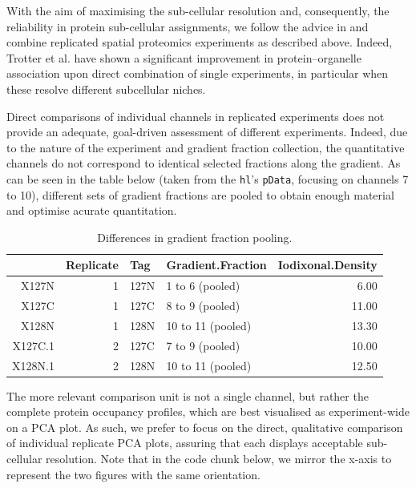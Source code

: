 With the aim of maximising the sub-cellular resolution and,
consequently, the reliability in protein sub-cellular assignments, we
follow the advice in \cite{Trotter:2010} and combine replicated spatial
proteomics experiments as described above. Indeed, Trotter et
al. have shown a significant improvement in protein–organelle
association upon direct combination of single experiments, in
particular when these resolve different subcellular niches.

Direct comparisons of individual channels in replicated experiments
does not provide an adequate, goal-driven assessment of different
experiments. Indeed, due to the nature of the experiment and gradient
fraction collection, the quantitative channels do not correspond to
identical selected fractions along the gradient. As can be seen in the
table below (taken from the \texttt{hl}'s \texttt{pData}, focusing on
channels 7 to 10), different sets of gradient fractions are pooled to
obtain enough material and optimise acurate quantitation.

\begin{table}[ht]
\centering
\begin{tabular}{rrllr}
  \hline
 & Replicate & Tag & Gradient.Fraction & Iodixonal.Density \\ 
  \hline
X127N &   1 & 127N & 1 to 6 (pooled) & 6.00 \\ 
  X127C &   1 & 127C & 8 to 9 (pooled) & 11.00 \\ 
  X128N &   1 & 128N & 10 to 11 (pooled) & 13.30 \\ 
  X127C.1 &   2 & 127C & 7 to 9 (pooled) & 10.00 \\ 
  X128N.1 &   2 & 128N & 10 to 11 (pooled) & 12.50 \\ 
   \hline
\end{tabular}
\caption{Differences in gradient fraction pooling.} 
\label{tab:pdtab}
\end{table}


The more relevant comparison unit is not a single channel, but rather
the complete protein occupancy profiles, which are best visualised as
experiment-wide on a PCA plot. As such, we prefer to focus on the
direct, qualitative comparison of individual replicate PCA plots,
assuring that each displays acceptable sub-cellular resolution. Note
that in the code chunk below, we mirror the x-axis to represent the
two figures with the same orientation.


